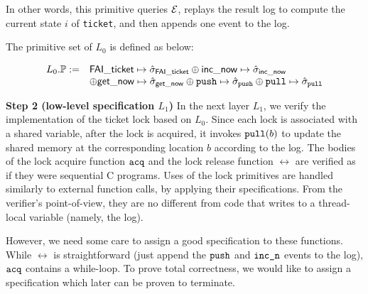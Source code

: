 {In other words, this primitive queries $\mathcal{E}$, replays the result log to
compute the current state $i$ of {\tt ticket},
and then appends one
 event to the log. 
The primitive set of $L_0$ is defined as below:
\begin{small}
\[
\begin{array}{rl}
L_0.\mathbb{P} := &\mathsf{FAI\_ticket} \mapsto \hat{\sigma}_{\mathsf{FAI\_ticket}}
\oplus \mathsf{inc\_now} \mapsto \hat{\sigma}_{\mathsf{inc\_now}} \\
&\oplus \mathsf{get\_now} \mapsto \hat{\sigma}_{\mathsf{get\_now}}\oplus  {\texttt{push}}\mapsto \hat{\sigma}_{{\texttt{push}}}
\oplus  {\texttt{pull}}\mapsto \hat{\sigma}_{{\texttt{pull}}}
\end{array}
\]
\end{small}%
\noindent\textbf{Step 2 (low-level specification $L_1$)}
In the next layer $L_1$, 
we verify the implementation of the ticket lock based on
 $L_0$. Since each lock is associated with a shared variable,
after the lock is acquired, it invokes ${\texttt{pull}}(b)$ 
to update the shared memory at the corresponding location $b$
according to the log.
The bodies of the lock acquire function ${\texttt{acq}}$ and 
the lock release function $\rel$ are verified as if they were 
sequential C programs. Uses of the lock primitives are handled
similarly to external function calls, by applying their
specifications. From the verifier's point-of-view, they are no 
different from code
that writes to a thread-local variable (namely, the log). 

However, we need some care to assign a good specification to these
functions. While $\rel$ is straightforward (just append the
${\texttt{push}}$ and ${\texttt{inc\_n}}$ events to the log), 
${\texttt{acq}}$ contains a while-loop. To prove total correctness,
we would like to assign a specification which later can be proven
to terminate.

}

